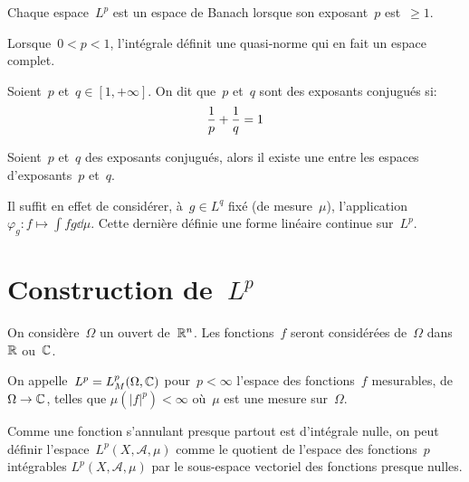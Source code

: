 \medskip
\begin{theoreme}
Chaque espace~$L^p$ est un espace de Banach lorsque son exposant~$p$ est~$\ge 1$.
\end{theoreme}

\begin{theoreme}
Lorsque~$0 < p < 1$, l'intégrale définit une quasi-norme qui en fait un espace complet.
\end{theoreme}


\medskip
\begin{definition}
Soient~$p$ et~$q\in [1,+\infty]$. On dit que~$p$ et~$q$ sont des exposants conjugués si:
\begin{equation}\colorred\dfrac1p + \dfrac1q = 1 \end{equation}
\end{definition}

\begin{theoreme}
Soient~$p$ et~$q$ des exposants conjugués, alors il existe une  entre les espaces d'exposants~$p$ et~$q$.
\end{theoreme}
Il suffit en effet de considérer, à~$g\in L^q$ fixé (de mesure~$\mu$), l'application~$\varphi_g: f\mapsto \int fg\dd\mu$. Cette dernière
définie une forme linéaire continue sur~$L^p$.

\medskip
\section{Construction de~$L^p$}

On considère~$\Omega$ un ouvert de~$\mathbb R^n$.
Les fonctions~$f$ seront considérées de~$\Omega$ dans~$\mathbb R$ ou~$\mathbb C$.

\medskip
On appelle~$\colorblue L^p \colorblack= L^p_M(\Omega,\CC)$ pour~$p<\infty$
l'espace des fonctions~$f$ mesurables, de~$\Omega \rightarrow \mathbb C$, telles que
$\mu(|f|^p)<\infty$ où~$\mu$ est une mesure sur~$\Omega$.

\medskip
Comme une fonction s'annulant presque partout est d'intégrale nulle, on peut définir
l'espace~$L^p(X, \mathcal{A}, \mu)$ comme le quotient de l'espace des fonctions~$p$ intégrables
$L^p(X, \mathcal{A}, \mu)$ par le sous-espace vectoriel des fonctions presque nulles.


